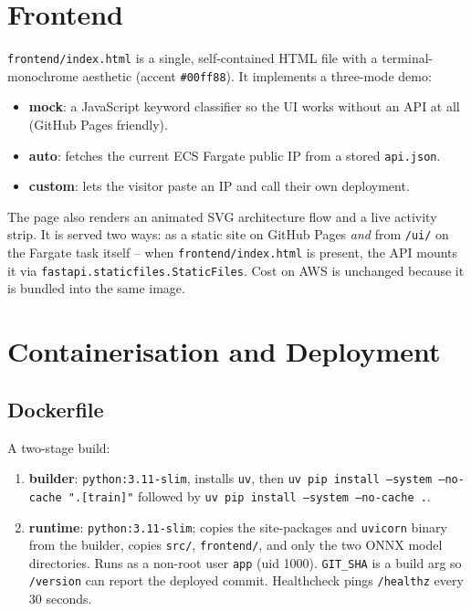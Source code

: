 \documentclass[11pt,a4paper]{article}
\begin{document}
\section{Frontend}

\texttt{frontend/index.html} is a single, self-contained HTML file with a
terminal-monochrome aesthetic (accent \texttt{\#00ff88}). It implements a
three-mode demo:

\begin{itemize}[leftmargin=*]
\item \textbf{mock}: a JavaScript keyword classifier so the UI works without an
      API at all (GitHub Pages friendly).
\item \textbf{auto}: fetches the current ECS Fargate public IP from a stored
      \texttt{api.json}.
\item \textbf{custom}: lets the visitor paste an IP and call their own deployment.
\end{itemize}

\noindent The page also renders an animated SVG architecture flow and a live
activity strip. It is served two ways: as a static site on GitHub Pages \emph{and}
from \texttt{/ui/} on the Fargate task itself -- when \texttt{frontend/index.html}
is present, the API mounts it via \texttt{fastapi.staticfiles.StaticFiles}. Cost on
AWS is unchanged because it is bundled into the same image.

\section{Containerisation and Deployment}

\subsection{Dockerfile}

A two-stage build:

\begin{enumerate}[leftmargin=*]
\item \textbf{builder}: \texttt{python:3.11-slim}, installs \texttt{uv}, then
      \texttt{uv pip install --system --no-cache ".[train]"} followed by
      \texttt{uv pip install --system --no-cache .}.
\item \textbf{runtime}: \texttt{python:3.11-slim}; copies the site-packages and
      \texttt{uvicorn} binary from the builder, copies \texttt{src/},
      \texttt{frontend/}, and only the two ONNX model directories. Runs as a
      non-root user \texttt{app} (uid 1000). \texttt{GIT\_SHA} is a build arg so
      \texttt{/version} can report the deployed commit. Healthcheck pings
      \texttt{/healthz} every 30 seconds.
\end{enumerate}
\end{document}
